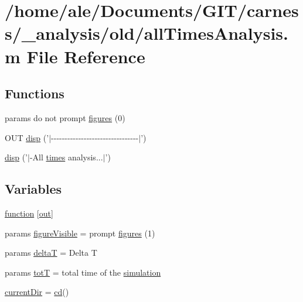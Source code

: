 \hypertarget{a00017}{\section{/home/ale/\-Documents/\-G\-I\-T/carness/\-\_\-analysis/old/all\-Times\-Analysis.m File Reference}
\label{a00017}
}
\subsection*{Functions}
\begin{DoxyCompactItemize}
\item 
params do not prompt \hyperlink{a00017_a22372587c75be87d9f79609e8fc7a815}{figures} (0)
\item 
O\-U\-T \hyperlink{a00017_a9be64ccaf83f215ee184d5aafefd7352}{disp} ('$|$-\/-\/-\/-\/-\/-\/-\/-\/-\/-\/-\/-\/-\/-\/-\/-\/-\/-\/-\/-\/-\/-\/-\/-\/-\/-\/-\/-\/-\/-\/-\/-\/$|$')
\item 
\hyperlink{a00017_a3bc93d8e435484e29a4cce2e7479360e}{disp} ('$|$-\/All \hyperlink{a00065_af3b4ff50e3fefed842dc431f3d32ff0e}{times} analysis...$|$')
\end{DoxyCompactItemize}
\subsection*{Variables}
\begin{DoxyCompactItemize}
\item 
\hyperlink{a00017_a370f3dd25136a73d619eba0aa2e3bb4b}{function} \mbox{[}\hyperlink{a00022_a34c820385e9209f49c18739329ad9206}{out}\mbox{]}
\item 
params \hyperlink{a00017_a63b4c2789d7e1513024181d12e4f1b6b}{figure\-Visible} = prompt \hyperlink{a00017_a22372587c75be87d9f79609e8fc7a815}{figures} (1)
\item 
params \hyperlink{a00017_a5318eae09f2b8ac76b2d6df39ba9c1cd}{delta\-T} = Delta T
\item 
params \hyperlink{a00017_aa9758857dd92f7845934f06daa7c4120}{tot\-T} = total time of the \hyperlink{a00065_a096e1441156fd2c744baece86d6b295c}{simulation}
\item 
\hyperlink{a00017_af32eb97339f1e9d37b5540de2cbc79c9}{current\-Dir} = \hyperlink{a00065_abe327856a9ee2f30f3ccafe4dc9edf5e}{cd}()
\end{DoxyCompactItemize}


